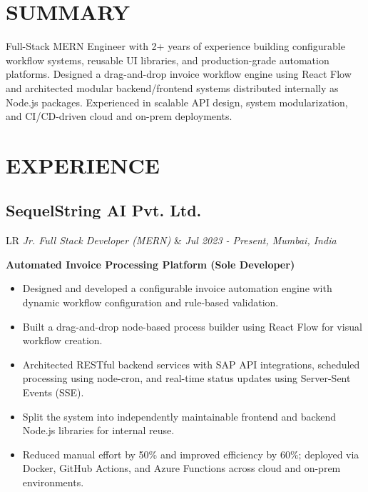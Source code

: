 \documentclass[10pt,a4paper]{moderncv}
\newcommand*{\experienceentry}[4]{
    \subsection{#1}
    \begin{tabularx}{\textwidth}{LR}
        {\itshape #2} & {\itshape #3, #4}
    \end{tabularx}
    \vspace{0.5mm}
}
\begin{document}
\maketitle



\section{SUMMARY}
Full-Stack MERN Engineer with 2+ years of experience building configurable workflow systems, reusable UI libraries, and production-grade automation platforms. Designed a drag-and-drop invoice workflow engine using React Flow and architected modular backend/frontend systems distributed internally as Node.js packages. Experienced in scalable API design, system modularization, and CI/CD-driven cloud and on-prem deployments.

\section{EXPERIENCE}

\experienceentry
{SequelString AI Pvt. Ltd.}
{Jr. Full Stack Developer (MERN)}
{Jul 2023 - Present}
{Mumbai, India}

\textbf{Automated Invoice Processing Platform (Sole Developer)}
\begin{itemize}
    \item Designed and developed a configurable invoice automation engine with dynamic workflow configuration and rule-based validation.
    \item Built a drag-and-drop node-based process builder using React Flow for visual workflow creation.
    \item Architected RESTful backend services with SAP API integrations, scheduled processing using node-cron, and real-time status updates using Server-Sent Events (SSE).
    \item Split the system into independently maintainable frontend and backend Node.js libraries for internal reuse.
    \item Reduced manual effort by 50\% and improved efficiency by 60\%; deployed via Docker, GitHub Actions, and Azure Functions across cloud and on-prem environments.
\end{itemize}
\end{document}
